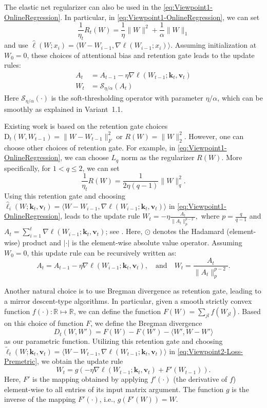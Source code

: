 \documentclass{article}
\newcommand{\vk}[0]{\mathbf{k}}
\newcommand{\vvv}[0]{\mathbf{v}}
\theoremstyle{plain}
\theoremstyle{definition}
\theoremstyle{remark}
\newcommand{\head}[1]{\vspace{1.7mm}\noindent{{\textcolor{c2}{\bf #1.}}}}
\begin{document}
\head{Variant 3: Elastic Net Regularization: Forgetting via Soft-thresholding} The elastic net regularizer can also be used in the \eqref{eq:Viewpoint1-OnlineRegression}. In particular, in \eqref{eq:Viewpoint1-OnlineRegression}, we can set
\[
\frac{1}{\eta_t}R_t(W) = \frac{1}{\eta} \|W\|^2 + \frac{1}{\alpha} \|W\|_1
\]
and use $\widehat{\ell}(W;x_i) = \langle W-W_{i-1}, \nabla \ell(W_{i-1};x_i)\rangle$. Assuming initialization at $W_0 = 0$, these choices of attentional bias and retention gate leads to the update rules:
\begin{align}
    A_t &= A_{t-1} - \eta \nabla \ell(W_{t-1};\vk_t, \vvv_t) \nonumber\\
    W_t &= \mathcal{S}_{\eta/\alpha} \left(A_t\right)
\end{align}
Here $\mathcal{S}_{\eta/\alpha} (\cdot)$ is the soft-thresholding operator with parameter $\eta/\alpha$, which can be smoothly as explained in Variant~1.1.





\head{Variant 4: General $L_q$ Memory Stability} Existing work is based on the retention gate choices $\mbox{D}_t(W,W_{t-1}) = \|W-W_{t-1}\|^2_F$ or $R(W) = \|W\|_2^2$. However, one can choose other choices of retention gate. For example, in \eqref{eq:Viewpoint1-OnlineRegression}, we can choose $L_q$ norm as the regularizer $R(W)$. More specifically, for $1<q\leq 2$, we can set 
\[
\frac{1}{\eta_t}R(W) = \frac{1}{2\eta (q-1)} \|W\|_q^2.
\]
Using this retention gate and choosing $\widehat{\ell}_i(W;\vk_t, \vvv_t) = \langle W-W_{i-1} , \nabla \ell(W_{i-1};\vk_t, \vvv_t)  \rangle$ in \eqref{eq:Viewpoint1-OnlineRegression},  leads to the update rule
$
W_t = - \eta \frac{A_t}{\|A_t\|_p^{p-2}},
$
where $p = \frac{q}{q-1}$ and $A_t = \sum_{i=1}^t\nabla \ell(W_{i-1};\vk_t, \vvv_t)$; see \cite[Section 2.6]{shalev2012online}. Here, $\odot$ denotes the Hadamard (element-wise) product and $|\cdot|$ is the element-wise absolute value operator.  Assuming $W_0 =0$, this update rule can be recursively written as:
\[
A_t = A_{t-1} - \eta \nabla \ell(W_{i-1};\vk_t, \vvv_t),
\quad
\textrm{and}
\quad
W_t = \frac{A_t}{\|A_t\|_p^{p-2}}.
\]

\head{Variant 5:  Bregman Divergence as Retention Gate.} Another natural choice is to use Bregman divergence as retention gate, leading to a mirror descent-type algorithms. In particular, given a smooth strictly convex function $f(\cdot):\mathbb{R} \mapsto \mathbb{R}$, we can define the function $F(W) = \sum_{jl} f(W_{jl})$. Based on this choice of function $F$, we define the Bregman divergence
\[
D_t(W,W') = F(W) - F(W') - \langle W', W-W'\rangle
\]
 as our parametric function. Utilizing this retention gate and choosing $\widetilde{\ell}_t(W;\vk_t, \vvv_t) = \langle W-W_{t-1} , \nabla \ell(W_{t-1};\vk_t, \vvv_t)  \rangle$
 in \eqref{eq:Viewpoint2-Loss-Premetric}, we obtain the update rule 
 \[
 W_t = g\left(-\eta \nabla \ell(W_{t-1};\vk_t, \vvv_t) + F'(W_{t-1})\right).
 \]
Here, $F'$ is the mapping obtained by applying $f'(\cdot)$ (the derivative of $f$) element-wise to all entries of its  input matrix argument. The function $g$ is the inverse of the mapping $F'(\cdot)$, i.e., $g(F'(W)) = W$. 
\end{document}
